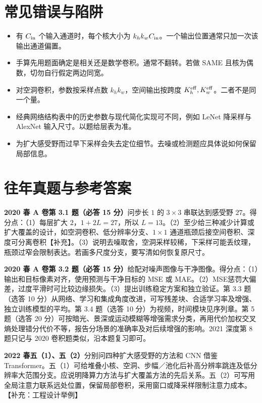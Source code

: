 \documentclass[UTF8,a4paper,zihao=-4,fontset=fandol]{ctexrep}
\begin{document}
\section{常见错误与陷阱}

\begin{itemize}
\item 有 $C_{\rm in}$ 个输入通道时，每个核大小为 $k_hk_wC_{\rm in}$。一个输出位置通常只加一次该输出通道偏置。
\item 手算先用题面确定是相关还是数学卷积。通常不翻转。若做 SAME 且核为偶数，切勿自行假定两边同宽。
\item 对空洞卷积，参数按采样点数 $k_hk_w$，空间输出按跨度 $K_h^{\rm eff},K_w^{\rm eff}$。二者不是同一个量。
\item 经典网络结构表中的历史参数与现代简化实现可不同，例如 LeNet 降采样与 AlexNet 输入尺寸。以题给层表为准。
\item 为扩大感受野而过早下采样会失去定位细节。去噪或检测题应具体说如何保留局部信息。
\end{itemize}

\section{往年真题与参考答案}

\textbf{2020 春 A 卷第 3.1 题（必答 15 分）}问步长 $1$ 的 $3\times3$ 串联达到感受野 $27$。得分点：（1）每层扩大 $2$，$1+2L=27$，所以 $L=13$。（2）至少给三种减少计算或扩大覆盖的设计，如空洞卷积、低分辨率分支、$1\times1$ 通道瓶颈后接空间卷积、深度可分离卷积【补充】。（3）说明去噪取舍，空洞采样较稀，下采样可能丢纹理，瓶颈过窄会限制表达。若画多尺度分支，要写清如何恢复原尺寸。

\textbf{2020 春 A 卷第 3.2 题（必答 15 分）}给配对噪声图像与干净图像。得分点：（1）输出和目标像素对齐，使用预测与干净目标的 MSE 或 MAE。（2）MSE惩罚大偏差，过度平滑时可比较边缘损失。（3）提出训练稳定方案和独立验证。第 3.3 题（选答 10 分）从网络、学习和集成角度改进，可写残差块、合适学习率及增强、独立训练模型的平均。第 3.4 题（选答 10 分）为视频，时间模块见序列章。第 5 题（选答 20 分）可按暗光、景深或运动模糊等增强需求分类，再用代价加权交叉熵处理错分代价不等，报告分场景的准确率及对后续增强的影响。2021 深度第 8 题只记与 2020 卷积题类似，沿本题复习即可。

\textbf{2022 春五（1）、五（2）}分别问四种扩大感受野的方法和 CNN 借鉴 Transformer。五（1）可给堆叠小核、空洞、步幅／池化后补高分辨率跳连及低分辨率大范围分支。应说明降算力方法与扩大覆盖方法的先后关系。五（2）可写用全局注意力联系远处位置，保留局部卷积，采用窗口或降采样限制注意力成本。【补充：工程设计举例】
\end{document}

